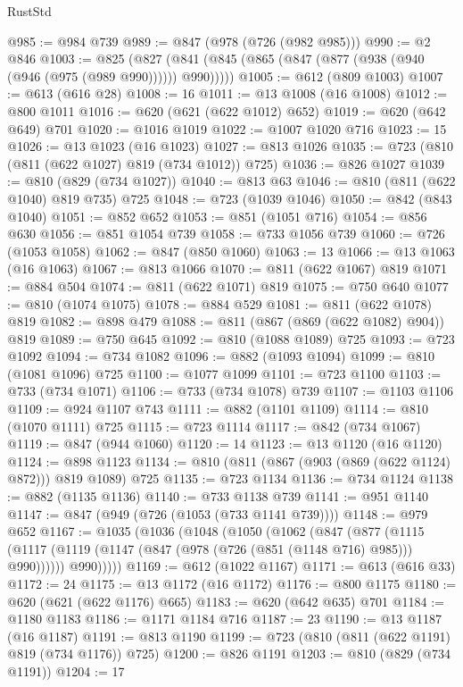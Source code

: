 \begin{lexlean}{RustStd}
\begin{coremodule}
@985 := @984 @739
@989 := @847 (@978 (@726 (@982 @985)))
@990 := @2 @846
@1003 := @825 (@827 (@841 (@845 (@865 (@847 (@877 (@938 (@940 (@946 (@975 (@989 @990)))))) @990)))))
@1005 := @612 (@809 @1003)
@1007 := @613 (@616 @28)
@1008 := 16
@1011 := @13 @1008 (@16 @1008)
@1012 := @800 @1011
@1016 := @620 (@621 (@622 @1012) @652)
@1019 := @620 (@642 @649) @701
@1020 := @1016 @1019
@1022 := @1007 @1020 @716
@1023 := 15
@1026 := @13 @1023 (@16 @1023)
@1027 := @813 @1026
@1035 := @723 (@810 (@811 (@622 @1027) @819 (@734 @1012)) @725)
@1036 := @826 @1027
@1039 := @810 (@829 (@734 @1027))
@1040 := @813 @63
@1046 := @810 (@811 (@622 @1040) @819 @735) @725
@1048 := @723 (@1039 @1046)
@1050 := @842 (@843 @1040)
@1051 := @852 @652
@1053 := @851 (@1051 @716)
@1054 := @856 @630
@1056 := @851 @1054 @739
@1058 := @733 @1056 @739
@1060 := @726 (@1053 @1058)
@1062 := @847 (@850 @1060)
@1063 := 13
@1066 := @13 @1063 (@16 @1063)
@1067 := @813 @1066
@1070 := @811 (@622 @1067) @819
@1071 := @884 @504
@1074 := @811 (@622 @1071) @819
@1075 := @750 @640
@1077 := @810 (@1074 @1075)
@1078 := @884 @529
@1081 := @811 (@622 @1078) @819
@1082 := @898 @479
@1088 := @811 (@867 (@869 (@622 @1082) @904)) @819
@1089 := @750 @645
@1092 := @810 (@1088 @1089) @725
@1093 := @723 @1092
@1094 := @734 @1082
@1096 := @882 (@1093 @1094)
@1099 := @810 (@1081 @1096) @725
@1100 := @1077 @1099
@1101 := @723 @1100
@1103 := @733 (@734 @1071)
@1106 := @733 (@734 @1078) @739
@1107 := @1103 @1106
@1109 := @924 @1107 @743
@1111 := @882 (@1101 @1109)
@1114 := @810 (@1070 @1111) @725
@1115 := @723 @1114
@1117 := @842 (@734 @1067)
@1119 := @847 (@944 @1060)
@1120 := 14
@1123 := @13 @1120 (@16 @1120)
@1124 := @898 @1123
@1134 := @810 (@811 (@867 (@903 (@869 (@622 @1124) @872))) @819 @1089) @725
@1135 := @723 @1134
@1136 := @734 @1124
@1138 := @882 (@1135 @1136)
@1140 := @733 @1138 @739
@1141 := @951 @1140
@1147 := @847 (@949 (@726 (@1053 (@733 @1141 @739))))
@1148 := @979 @652
@1167 := @1035
    (@1036
      (@1048
        (@1050
          (@1062
            (@847
              (@877
                (@1115 (@1117 (@1119 (@1147 (@847 (@978 (@726 (@851 (@1148 @716) @985))) @990))))))
              @990)))))
@1169 := @612 (@1022 @1167)
@1171 := @613 (@616 @33)
@1172 := 24
@1175 := @13 @1172 (@16 @1172)
@1176 := @800 @1175
@1180 := @620 (@621 (@622 @1176) @665)
@1183 := @620 (@642 @635) @701
@1184 := @1180 @1183
@1186 := @1171 @1184 @716
@1187 := 23
@1190 := @13 @1187 (@16 @1187)
@1191 := @813 @1190
@1199 := @723 (@810 (@811 (@622 @1191) @819 (@734 @1176)) @725)
@1200 := @826 @1191
@1203 := @810 (@829 (@734 @1191))
@1204 := 17

\end{coremodule}
\end{lexlean}
